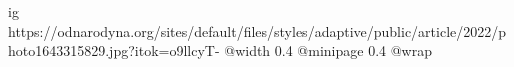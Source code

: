 
 
 
 
 

\ifcmt
  ig https://odnarodyna.org/sites/default/files/styles/adaptive/public/article/2022/photo1643315829.jpg?itok=o9llcyT-
  @width 0.4
  @minipage 0.4
  @wrap \parpic[r]
\fi
